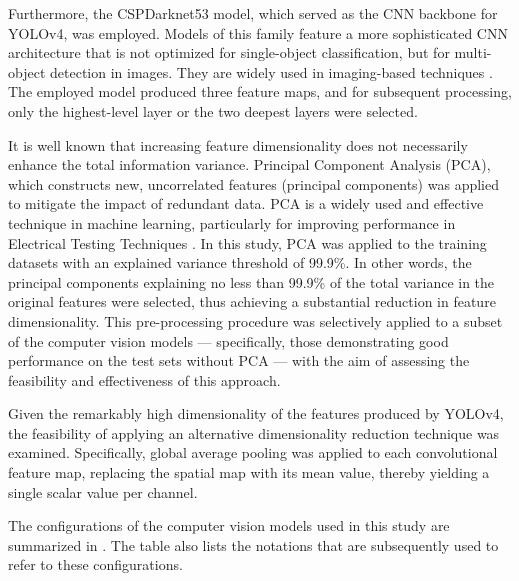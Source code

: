 \documentclass[10pt]{iopart}
\begin{document}
Furthermore, the CSPDarknet53 model, which served as the CNN backbone for YOLOv4, was employed.
Models of this family feature a more sophisticated CNN architecture that is not optimized for single-object classification,
but for multi-object detection in images.
They are widely used in imaging-based techniques \cite{Liu2024a, Li2024a, Chen2022}.
The employed model produced three feature maps, and for subsequent processing, only the highest-level layer or the two deepest layers were selected.

It is well known that increasing feature dimensionality does not necessarily enhance the total information variance.
Principal Component Analysis (PCA), which constructs new, uncorrelated features (principal components)
was applied to mitigate the impact of redundant data.
PCA is a widely used and effective technique in machine learning, particularly for improving performance in Electrical Testing Techniques \cite{Fadhel2019, Gao2020}.
In this study, PCA was applied to the training datasets with an explained variance threshold of 99.9\%.
In other words, the principal components explaining no less than 99.9\% of the total variance in the original features were selected,
thus achieving a substantial reduction in feature dimensionality.
This pre-processing procedure was selectively applied to a subset of the computer vision models ---
specifically, those demonstrating good performance on the test sets without PCA --- with the aim of assessing the feasibility and effectiveness of this approach.

Given the remarkably high dimensionality of the features produced by YOLOv4,
the feasibility of applying an alternative dimensionality reduction technique was examined.
Specifically, global average pooling was applied to each convolutional feature map,
replacing the spatial map with its mean value, thereby yielding a single scalar value per channel.

The configurations of the computer vision models used in this study are summarized in .
The table also lists the notations that are subsequently used to refer to these configurations.
\end{document}
